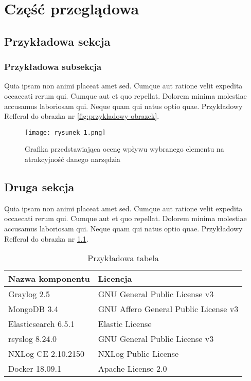\chapter{Część przeglądowa}

\section{Przykładowa sekcja}


\subsection{Przykładowa subsekcja}
Quia ipsam non animi placeat amet sed. Cumque aut ratione velit expedita occaecati rerum qui. Cumque aut et quo repellat. Dolorem minima molestiae accusamus laboriosam qui. Neque quam qui natus optio quae. Przykładowy Refferal do obrazka nr \ref{fig:przykladowy-obrazek}.

\begin{figure}[ht]
        \centering
        \texttt{[image: rysunek\_1.png]}
        \caption{Grafika przedstawiająca ocenę wpływu wybranego elementu na atrakcyjność danego narzędzia}
        \label{fig:rysunek_1}
\end{figure}

\newpage

\section{Druga sekcja}
Quia ipsam non animi placeat amet sed. Cumque aut ratione velit expedita occaecati rerum qui. Cumque aut et quo repellat. Dolorem minima molestiae accusamus laboriosam qui. Neque quam qui natus optio quae. Przykładowy Refferal do obrazka nr \ref{table:przykladowa-tabela}.

\begin{table}[htb]
	\centering
	\caption{Przykładowa tabela}
	\label{table:przykladowa-tabela}

    \begin{tabular}{| l | l |}
    \hline
    Nazwa komponentu & Licencja \\ \hline
    Graylog 2.5 & GNU General Public License v3 \\ \hline
    MongoDB 3.4 & GNU Affero General Public License v3 \\ \hline
    Elasticsearch 6.5.1 & Elastic License \cite{elastic-license} \\ \hline
    rsyslog 8.24.0 & GNU General Public License v3  \\ \hline
    NXLog CE 2.10.2150& NXLog Public License  \\ \hline
    Docker 18.09.1 & Apache License 2.0  \\
    \hline
    \end{tabular}
\end{table}

\newpage